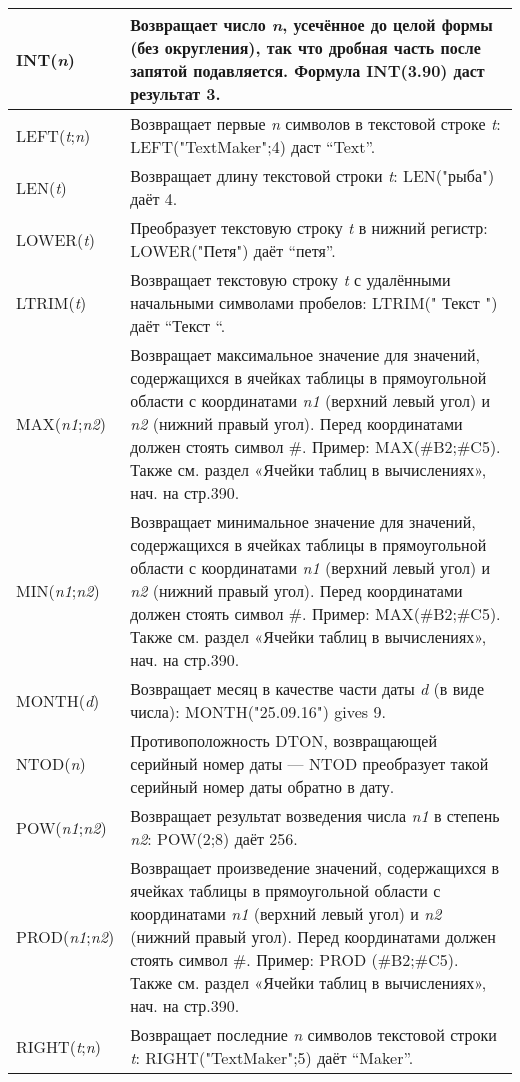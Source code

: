 ﻿\documentclass[a4paper,10pt]{article}
\begin{document}
\begin{center}
\begin{longtable}{  m{3cm} | m{13cm}  }
\hline
INT(\textit{n}) & Возвращает число \textit{n}, усечённое до целой формы (без округления), так что дробная часть после запятой подавляется. Формула INT(3.90) даст результат 3.\\
\hline
LEFT(\textit{t};\textit{n}) & Возвращает первые \textit{n} символов в текстовой строке \textit{t}: LEFT("TextMaker";4) даст “Text”.\\
\hline
LEN(\textit{t}) & Возвращает длину текстовой строки \textit{t}: LEN("рыба") даёт 4.\\
\hline
LOWER(\textit{t}) & Преобразует текстовую строку \textit{t} в нижний регистр: LOWER("Петя") даёт “петя”.\\
\hline
LTRIM(\textit{t}) & Возвращает текстовую строку \textit{t} с удалёнными начальными символами пробелов: LTRIM(" Текст ") даёт “Текст “.\\
\hline
MAX(\textit{n1};\textit{n2}) & Возвращает максимальное значение для значений, содержащихся в ячейках таблицы в прямоугольной области с координатами \textit{n1} (верхний левый угол) и \textit{n2} (нижний правый угол). Перед координатами должен стоять символ \#. Пример: MAX(\#B2;\#C5). Также см. раздел «Ячейки таблиц в вычислениях», нач. на стр.390.\\
\hline
MIN(\textit{n1};\textit{n2}) & Возвращает минимальное значение для значений, содержащихся в ячейках таблицы в прямоугольной области с координатами \textit{n1} (верхний левый угол) и \textit{n2} (нижний правый угол). Перед координатами должен стоять символ \#. Пример: MAX(\#B2;\#C5). Также см. раздел «Ячейки таблиц в вычислениях», нач. на стр.390.\\
\hline
MONTH(\textit{d}) & Возвращает месяц в качестве части даты \textit{d} (в виде числа): MONTH("25.09.16") gives 9.\\
\hline
NTOD(\textit{n}) & Противоположность DTON, возвращающей серийный номер даты — NTOD преобразует такой серийный номер даты обратно в дату.\\
\hline
POW(\textit{n1};\textit{n2}) & Возвращает результат возведения числа \textit{n1} в степень \textit{n2}: POW(2;8) даёт 256.\\
\hline
PROD(\textit{n1};\textit{n2}) & Возвращает произведение значений, содержащихся в ячейках таблицы в прямоугольной области с координатами \textit{n1} (верхний левый угол) и \textit{n2} (нижний правый угол). Перед координатами должен стоять символ \#. Пример: PROD (\#B2;\#C5). Также см. раздел «Ячейки таблиц в вычислениях», нач. на стр.390.\\
\hline
RIGHT(\textit{t};\textit{n}) & Возвращает последние \textit{n} символов текстовой строки \textit{t}: RIGHT("TextMaker";5) даёт “Maker”.\\

\end{longtable}
\end{center}
\end{document}
